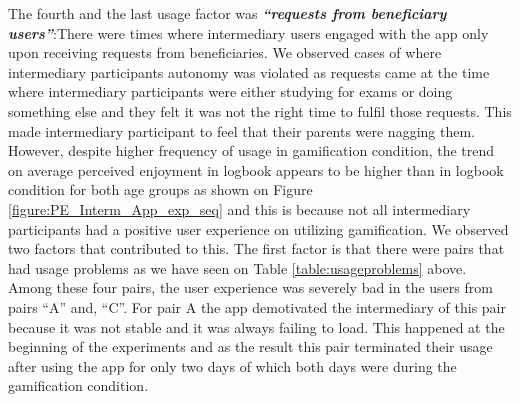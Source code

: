 \documentclass{sig-alternate}
\begin{document}
The fourth and the last usage factor was \emph{\textbf{``requests from beneficiary users''}}:There were times where intermediary users engaged with the app only upon receiving requests from beneficiaries.  We observed cases of where intermediary participants autonomy was violated as requests came at the time where intermediary participants were either studying for exams or doing something else and they felt it was not the right time to fulfil those requests. This made intermediary participant to feel that their parents were nagging them.\newline
However, despite higher frequency of usage in gamification condition, the trend on average perceived enjoyment in logbook appears to be higher than in logbook condition for both age groups as shown on Figure \ref{figure:PE_Interm_App_exp_seq} and this is because not all intermediary participants had a positive user experience on utilizing gamification. We observed two factors that contributed  to this. The first factor is that there were pairs that had usage problems as we have seen on Table \ref{table:usageproblems} above. Among these four pairs, the user experience was severely bad in the users from pairs ``A'' and, ``C''.\newline
For pair A the app demotivated the intermediary of this pair because it was not stable  and it was always failing to load. This happened at the beginning of the experiments and as the result this pair terminated their usage after using the app for only two days of which both days were during the gamification condition.\newline
\end{document}
